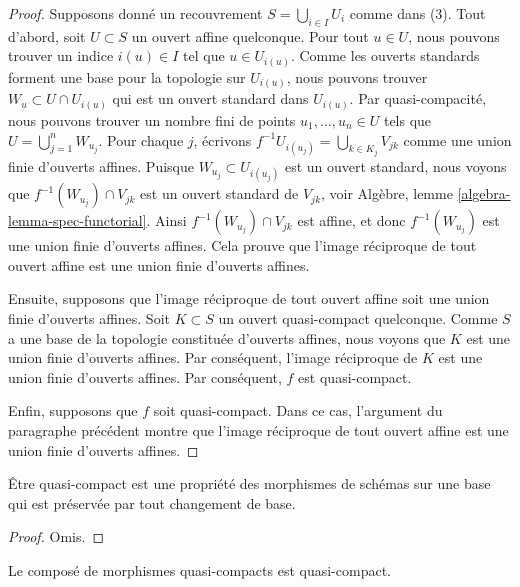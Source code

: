 \begin{proof}
Supposons donné un recouvrement $S = \bigcup_{i \in I} U_i$ comme dans
(3). Tout d'abord, soit $U \subset S$ un ouvert affine quelconque. Pour
tout $u \in U$, nous pouvons trouver un indice $i(u) \in I$ tel que $u
\in U_{i(u)}$. Comme les ouverts standards forment une base pour la topologie sur
$U_{i(u)}$, nous pouvons trouver $W_u \subset U \cap U_{i(u)}$ qui est un ouvert
standard dans $U_{i(u)}$. Par quasi-compacité, nous pouvons trouver un nombre fini de
points $u_1, \ldots, u_n \in U$ tels que $U = \bigcup_{j = 1}^n W_{u_j}$.
Pour chaque $j$, écrivons $f^{-1}U_{i(u_j)} = \bigcup_{k \in K_j}
V_{jk}$ comme une union finie d'ouverts affines. Puisque $W_{u_j} \subset U_{i(u_j)}$
est un ouvert standard, nous voyons que $f^{-1}(W_{u_j}) \cap V_{jk}$
est un ouvert standard de $V_{jk}$, voir Algèbre, lemme \ref{algebra-lemma-spec-functorial}.
Ainsi $f^{-1}(W_{u_j}) \cap V_{jk}$ est affine, et
donc $f^{-1}(W_{u_j})$ est une union finie d'ouverts affines. Cela prouve que
l'image réciproque de tout ouvert affine est une union finie d'ouverts affines.

\medskip\noindent
Ensuite, supposons que l'image réciproque de tout ouvert affine soit une union
finie d'ouverts affines. Soit
$K \subset S$ un ouvert quasi-compact quelconque. Comme $S$ a une base de la
topologie constituée d'ouverts affines, nous voyons que $K$ est une union finie
d'ouverts affines. Par conséquent, l'image réciproque de $K$ est une union finie
d'ouverts affines. Par conséquent, $f$ est quasi-compact.

\medskip\noindent
Enfin, supposons que $f$ soit quasi-compact. Dans ce cas, l'argument du
paragraphe précédent montre que l'image réciproque de tout ouvert affine est
une union finie d'ouverts affines.
\end{proof}

\begin{lemma}
\label{lemma-quasi-compact-preserved-base-change}
Être quasi-compact est une propriété des morphismes de schémas
sur une base qui est préservée par tout changement de base.
\end{lemma}

\begin{proof}
Omis.
\end{proof}

\begin{lemma}
\label{lemma-composition-quasi-compact}
Le composé de morphismes quasi-compacts est quasi-compact.
\end{lemma}

